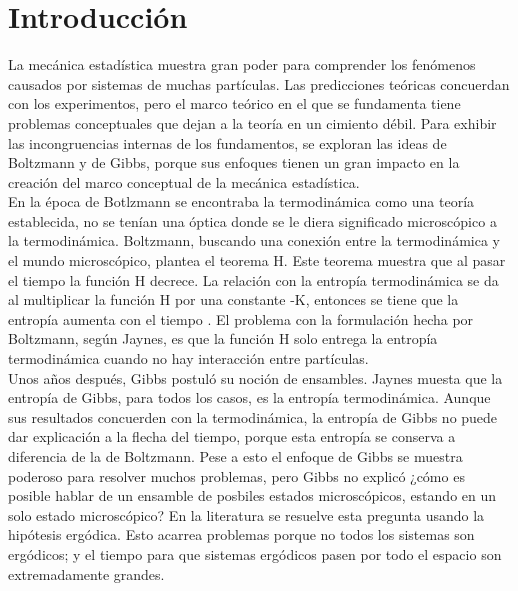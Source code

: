 \chapter{Introducción} 

La mecánica estadística muestra gran poder para comprender los fenómenos causados por sistemas de muchas partículas. Las predicciones teóricas concuerdan con los experimentos, pero el marco teórico en el que se fundamenta tiene problemas conceptuales que dejan a la teoría en un cimiento débil.  Para exhibir las incongruencias internas de los fundamentos, se exploran las ideas de Boltzmann y de Gibbs, porque sus enfoques tienen un gran impacto en la creación del marco conceptual de la mecánica estadística.
\\ 
En la época de Botlzmann se encontraba la termodinámica como una teoría establecida, no se tenían una óptica donde se le diera significado microscópico a la termodinámica. Boltzmann, buscando una conexión entre la termodinámica y  el mundo microscópico, plantea el teorema H. Este teorema muestra que al pasar el tiempo la función H decrece. La relación con la entropía termodinámica se da al multiplicar la función H por una constante -K, entonces se tiene que la entropía aumenta con el tiempo \cite{Ehrenfest}. El problema con la formulación hecha por Boltzmann, según Jaynes, es que la función H solo entrega la entropía termodinámica  cuando no hay interacción entre partículas.
\\
Unos años después, Gibbs postuló su noción de ensambles. Jaynes muesta que la entropía de Gibbs, para todos los casos, es la entropía termodinámica. Aunque sus resultados concuerden con la termodinámica, la entropía de Gibbs no puede dar explicación a la flecha del tiempo, porque esta entropía se conserva a diferencia de la de Boltzmann. Pese a esto el enfoque de Gibbs se muestra poderoso para resolver muchos problemas, pero Gibbs no explicó ¿cómo es posible hablar de un ensamble de posbiles estados microscópicos, estando en un solo estado microscópico? En la literatura se resuelve esta pregunta usando la hipótesis ergódica. Esto acarrea problemas porque no todos los sistemas son ergódicos; y el tiempo para que sistemas ergódicos pasen por todo el espacio son extremadamente grandes. 
